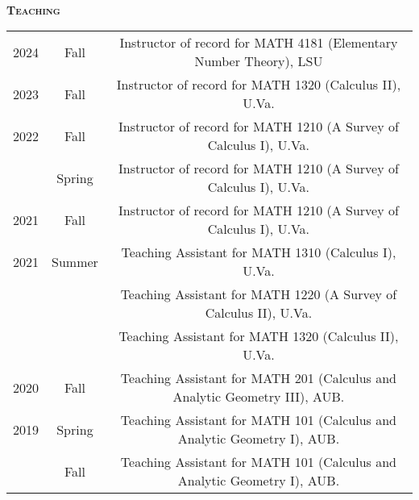 \documentclass[11pt]{amsart}
\theoremstyle{remark}
\begin{document}
{\
 
\large{\textbf{\textsc{Teaching}}}

\bgroup
\def\arraystretch{1.3}
\begin{tabular}{ c c c }
2024 & Fall & \hspace{-0.5in}Instructor of record for MATH 4181 (Elementary Number Theory), LSU \\
2023 & Fall & \hspace{-0.1in}\hspace{-0.65in}\hspace{-0.85in}Instructor of record for MATH 1320 (Calculus II), U.Va. \\
2022 & Fall &  \hspace{-0.1in}\hspace{-0.65in}Instructor of record for MATH 1210 (A Survey of Calculus I), U.Va. \\
     & Spring & \hspace{-0.1in}\hspace{-0.65in}Instructor of record for MATH 1210 (A Survey of Calculus I), U.Va. \\
2021 & Fall &  \hspace{-0.1in}\hspace{-0.65in}Instructor of record for MATH 1210 (A Survey of Calculus I), U.Va.  \\
2021 & Summer & \hspace{-0.1in}\hspace{-0.65in}\hspace{-1in}Teaching Assistant for MATH 1310 (Calculus I), U.Va. \\
     &        & \hspace{-0.1in}\hspace{-0.65in}\hspace{-0.03in}Teaching Assistant for MATH 1220 (A Survey of Calculus II), U.Va. \\
     &        & \hspace{-0.1in}\hspace{-0.65in}\hspace{-0.95in}Teaching Assistant for MATH 1320 (Calculus II), U.Va. \\
2020 &  Fall   & Teaching Assistant for MATH 201 (Calculus and Analytic Geometry III), AUB.\\
2019 & Spring   & \hspace{-0.1in}Teaching Assistant for MATH 101 (Calculus and Analytic Geometry I), AUB. \\
     & Fall     & \hspace{-0.1in}Teaching Assistant for MATH 101 (Calculus and Analytic Geometry I), AUB.


\end{tabular}}
\end{document}
